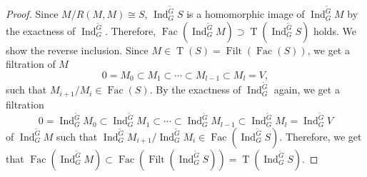 \documentclass[pdftex,a4paper]{article}
\numberwithin{equation}{subsection}
\theoremstyle{definition}
\newcommand{\induc}{{\operatorname{Ind}\nolimits}}
\newcommand{\Fac}{\operatorname{\mathrm{Fac}}}
\newcommand{\Filt}{\operatorname{\mathrm{Filt}}}
\newcommand{\torscl}{\operatorname{\mathrm{T}}}
\begin{document}
\begin{proof}
	Since \(M/R(M,M)\cong S\), \(\induc_G^{\tilde{G}} S\) is a homomorphic image of \(\induc_G^{\tilde{G}}M\) by the exactness of \(\induc_G^{\tilde{G}}\).
	Therefore, \(\Fac (\induc_G^{\tilde{G}}M)\supset\torscl(\induc_G^{\tilde{G}}S)\) holds.
	We show the reverse inclusion.
	Since \(M \in \torscl(S)=\Filt (\Fac (S))\), we get a filtration of \(M\)
	\begin{equation}
		0=M_0\subset M_1\subset \cdots\subset M_{l-1}\subset M_l=V,
	\end{equation}
	such that \(M_{i+1}/M_i\in \Fac(S)\).
	By the exactness of \(\induc_G^{\tilde{G}}\) again, we get a filtration
	\begin{equation}
		0=\induc_G^{\tilde{G}}M_0\subset \induc_G^{\tilde{G}}M_1\subset \cdots\subset \induc_G^{\tilde{G}}M_{l-1}\subset \induc_G^{\tilde{G}}M_l=\induc_G^{\tilde{G}}V
	\end{equation}
	of \(\induc_G^{\tilde{G}} M\) such that
	\(\induc_G^{\tilde{G}}M_{i+1}/\induc_G^{\tilde{G}}M_i\in \Fac(\induc_G^{\tilde{G}}S)\).
	Therefore, we get that \(\Fac (\induc_G^{\tilde{G}}M)\subset\Fac(\Filt(\induc_G^{\tilde{G}}S))=\torscl(\induc_G^{\tilde{G}}S)\).
\end{proof}
\end{document}
